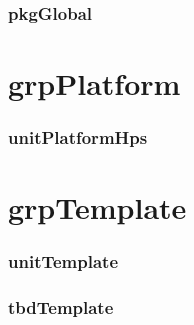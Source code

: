 \documentclass{article}
\begin{document}


\subsubsection{pkgGlobal}



\section{grpPlatform}

\subsubsection{unitPlatformHps}



\section{grpTemplate}

\subsubsection{unitTemplate}



\subsubsection{tbdTemplate}


\end{document}
